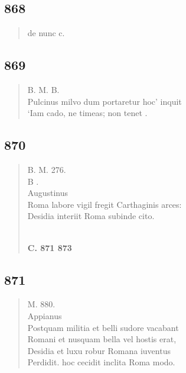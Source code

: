 \documentclass[11pt, a4paper]{report}
\begin{document}
            \subsection*{868}
      \begin{verse}
      de nunc c. \\ 
      \end{verse}
  
            \subsection*{869}
      \begin{verse}
      B. M. B. \\ Pulcinus milvo dum portaretur hoc’ inquit \\ ‘Iam cado, ne timeas; non tenet . \\ 
      \end{verse}
  
            \subsection*{870}
      \begin{verse}
      B. M. 276. \\ B . \\ Augustinus \\ Roma labore vigil fregit Carthaginis arces: \\ Desidia interiit Roma subinde cito. \\ 
        ﻿\pagebreak 
    \begin{center} \textbf{C. 871 873} \end{center} \marginpar{[318]} 
      \end{verse}
  
            \subsection*{871}
      \begin{verse}
      M. 880. \\ Appianus \\ Postquam militia et belli sudore vacabant \\ Romani et nusquam bella vel hostis erat, \\ Desidia et luxu robur Romana iuventus \\ Perdidit. hoc cecidit inclita Roma modo. \\ 
      \end{verse}
  
\end{document}
